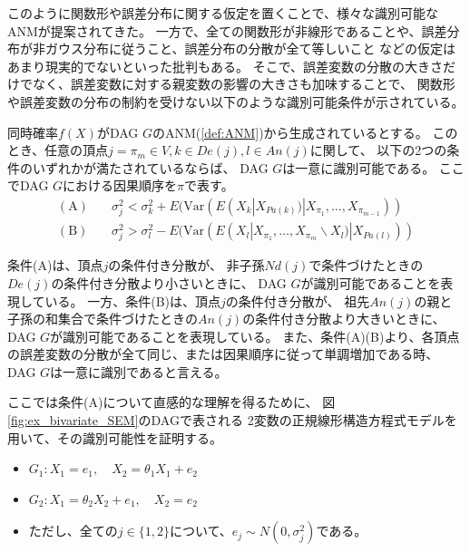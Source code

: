 このように関数形や誤差分布に関する仮定を置くことで、様々な識別可能なANMが提案されてきた。
一方で、全ての関数形が非線形であることや、誤差分布が非ガウス分布に従うこと、誤差分布の分散が全て等しいこと
などの仮定はあまり現実的でないといった批判もある。
そこで、誤差変数の分散の大きさだけでなく、誤差変数に対する親変数の影響の大きさも加味することで、
関数形や誤差変数の分布の制約を受けない以下のような識別可能条件が示されている\cite{Park2020-ey}。

\begin{theo}
  同時確率$f(X)$がDAG $G$のANM(\ref{def:ANM})から生成されているとする。
  このとき、任意の頂点$j = \pi_m \in V, k \in De(j), l \in An(j)$に関して、
  以下の2つの条件のいずれかが満たされているならば、
  DAG $G$は一意に識別可能である。
  ここでDAG $G$における因果順序を$\pi$で表す。
  \begin{align*}
    (\text{A}) \quad &\sigma_j^2 < \sigma_k^2 + E(\mathrm{Var}(E(X_k | X_{Pa(k)}) | X_{\pi_1}, \dots, X_{\pi_{m-1}})) \\
    (\text{B}) \quad &\sigma_j^2 > \sigma_l^2 - E(\mathrm{Var}(E(X_l | X_{\pi_1}, \dots, X_{\pi_m} \backslash X_l) | X_{Pa(l)}))
  \end{align*}
\end{theo}

条件(A)は、頂点$j$の条件付き分散が、
非子孫$Nd(j)$で条件づけたときの$De(j)$の条件付き分散より小さいときに、
DAG $G$が識別可能であることを表現している。
一方、条件(B)は、頂点$j$の条件付き分散が、
祖先$An(j)$の親と子孫の和集合で条件づけたときの$An(j)$の条件付き分散より大きいときに、
DAG $G$が識別可能であることを表現している。
また、条件(A)(B)より、各頂点の誤差変数の分散が全て同じ、または因果順序に従って単調増加である時、
DAG $G$は一意に識別であると言える。

ここでは条件(A)について直感的な理解を得るために、
図\ref{fig:ex_bivariate_SEM}のDAGで表される
2変数の正規線形構造方程式モデルを用いて、その識別可能性を証明する。

\begin{itemize}
  \item
  $G_1 \colon X_1 = e_1,
   \quad X_2 = \theta_1 X_1 + e_2$

  \item
  $G_2 \colon X_1 = \theta_2 X_2 + e_1,
   \quad X_2 = e_2$

  \item
  ただし、全ての$j \in \{ 1,2 \}$について、$e_j \sim N(0, \sigma_j^2)$である。
\end{itemize}

